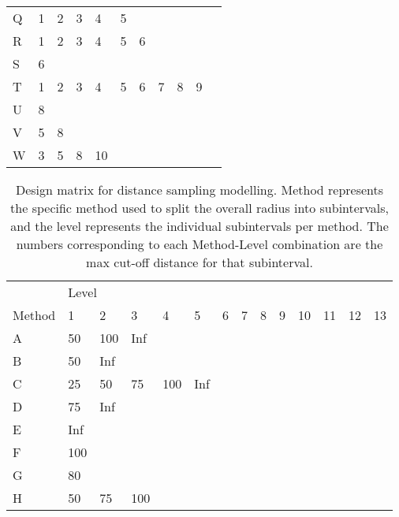 \begin{table}[]
\begin{tabular}{l|llllllllll}
		Q      & 1    & 2    & 3  & 4  & 5 &   &   &   &    &    \\
		R      & 1    & 2    & 3  & 4  & 5 & 6 &   &   &    &    \\
		S      & 6    &      &    &    &   &   &   &   &    &    \\
		T      & 1    & 2    & 3  & 4  & 5 & 6 & 7 & 8 & 9  &    \\
		U      & 8    &      &    &    &   &   &   &   &    &    \\
		V      & 5    & 8    &    &    &   &   &   &   &    &    \\
		W      & 3    & 5    & 8  & 10 &   &   &   &   &    &   
	\end{tabular}
\end{table}

\begin{table}[]
			\caption{Design matrix for distance sampling modelling. Method represents the specific method used to split the overall radius into subintervals, and the level represents the individual subintervals per method. The numbers corresponding to each Method-Level combination are the max cut-off distance for that subinterval.}
	\label{table:distance-design}
	\begin{tabular}{l|lllllllllllll}
		\hline
		& \multicolumn{12}{l}{Level}                                           &     \\
		\cline{2-14}
		Method & 1   & 2   & 3   & 4   & 5   & 6   & 7   & 8   & 9  & 10  & 11  & 12  & 13  \\
		\hline
		A      & 50  & 100 & Inf &     &     &     &     &     &    &     &     &     &     \\
		B      & 50  & Inf &     &     &     &     &     &     &    &     &     &     &     \\
		C      & 25  & 50  & 75  & 100 & Inf &     &     &     &    &     &     &     &     \\
		D      & 75  & Inf &     &     &     &     &     &     &    &     &     &     &     \\
		E      & Inf &     &     &     &     &     &     &     &    &     &     &     &     \\
		F      & 100 &     &     &     &     &     &     &     &    &     &     &     &     \\
		G      & 80  &     &     &     &     &     &     &     &    &     &     &     &     \\
		H      & 50  & 75  & 100 &     &     &     &     &     &    &     &     &     &     \\

\end{tabular}
\end{table}
